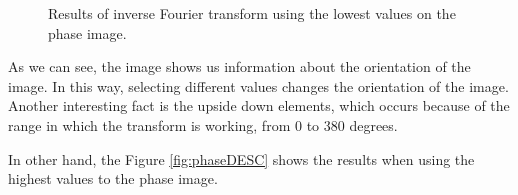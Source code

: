 \documentclass[12pt,a4paper]{article}
\begin{document}
\begin{itemize}
\begin{figure}[!h]
		\quad
		\quad
		
		\caption{Results of inverse Fourier transform using the lowest values on the phase image.}
		\label{fig:phaseINC}
	\end{figure}
	
	As we can see, the image shows us information about the orientation of the image. In this way, selecting different values changes the orientation of the image. Another interesting fact is the upside down elements, which occurs because of the range in which the transform is working, from 0 to 380 degrees.
	
	In other hand, the Figure \ref{fig:phaseDESC} shows the results when using the highest values to the phase image.
	

\end{itemize}
\end{document}
